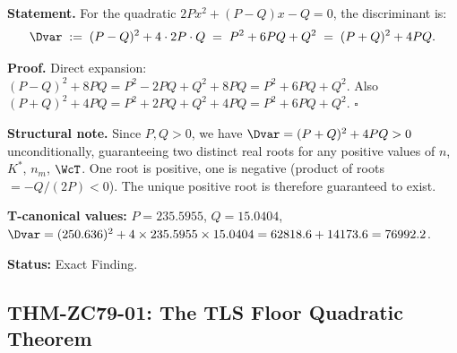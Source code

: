 \documentclass[12pt, a4paper]{article}
\begin{document}
\begin{derivedbox}[title={FIND-ZC79-01: Discriminant Identity ($R_0$, Exact)}]

\textbf{Statement.}
For the quadratic $2Px^2 + (P-Q)x - Q = 0$, the discriminant is:
\begin{equation}
  \Dvar \;:=\; (P-Q)^2 + 4\cdot 2P\cdot Q
  \;=\; P^2 + 6PQ + Q^2
  \;=\; (P+Q)^2 + 4PQ.
  \label{eq:disc}
\end{equation}

\textbf{Proof.}
Direct expansion:
$(P-Q)^2 + 8PQ = P^2 - 2PQ + Q^2 + 8PQ = P^2 + 6PQ + Q^2$.
Also $(P+Q)^2 + 4PQ = P^2 + 2PQ + Q^2 + 4PQ = P^2 + 6PQ + Q^2$.
$\square$

\textbf{Structural note.}
Since $P, Q > 0$, we have $\Dvar = (P+Q)^2 + 4PQ > 0$
unconditionally, guaranteeing two distinct real roots for any
positive values of $n$, $K^*$, $n_m$, $\WcT$.
One root is positive, one is negative
(product of roots $= -Q/(2P) < 0$).
The unique positive root is therefore guaranteed to exist.

\textbf{T-canonical values:}
$P = 235.5955$, $Q = 15.0404$,
$\Dvar = (250.636)^2 + 4 \times 235.5955 \times 15.0404
= 62818.6 + 14173.6 = 76992.2$.

\textbf{Status:} Exact Finding.
\end{derivedbox}

\subsection{THM-ZC79-01: The TLS Floor Quadratic Theorem}
\label{sec:thm}

\end{document}
